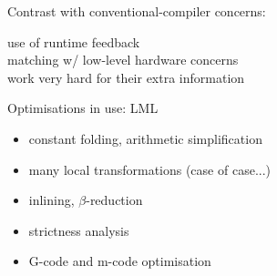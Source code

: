 \begin{note}
Contrast with conventional-compiler concerns:

use of runtime feedback\\
matching w/ low-level hardware concerns\\
work very hard for their extra information
\end{note}

\begin{slide}{}
{\Large Optimisations in use: LML}

\begin{itemize}
\item
constant folding, arithmetic simplification
\item
many local transformations (case of case...)
\item
inlining, $\beta$-reduction
\item
strictness analysis
\item
G-code and m-code optimisation
\end{itemize}
\end{slide}
